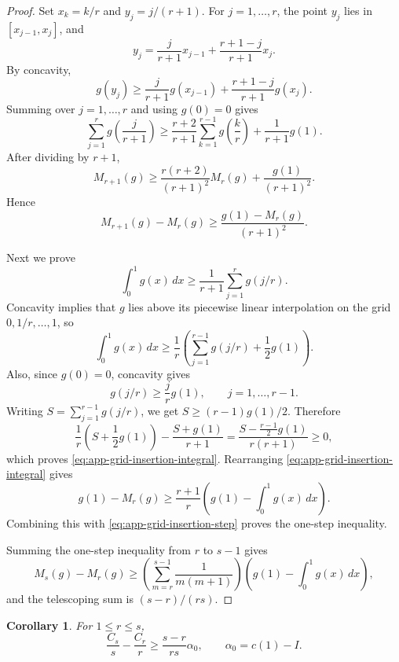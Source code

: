 \documentclass[11pt]{article}
\numberwithin{equation}{section}
\newtheorem{corollary}[corollary]{Corollary}
\newcommand{\dd}{\,d}
\begin{document}
\begin{proof}
Set $x_k=k/r$ and $y_j=j/(r+1)$. For $j=1,\ldots,r$, the point $y_j$ lies in $[x_{j-1},x_j]$, and
\[
  y_j
  =
  \frac{j}{r+1}x_{j-1}
  +
  \frac{r+1-j}{r+1}x_j.
\]
By concavity,
\[
  g(y_j)
  \ge
  \frac{j}{r+1}g(x_{j-1})
  +
  \frac{r+1-j}{r+1}g(x_j).
\]
Summing over $j=1,\ldots,r$ and using $g(0)=0$ gives
\[
  \sum_{j=1}^r g\left(\frac{j}{r+1}\right)
  \ge
  \frac{r+2}{r+1}\sum_{k=1}^{r-1}g\left(\frac{k}{r}\right)
  +
  \frac{1}{r+1}g(1).
\]
After dividing by $r+1$,
\[
  M_{r+1}(g)
  \ge
  \frac{r(r+2)}{(r+1)^2}M_r(g)
  +
  \frac{g(1)}{(r+1)^2}.
\]
Hence
\begin{equation}\label{eq:app-grid-insertion-step}
  M_{r+1}(g)-M_r(g)
  \ge
  \frac{g(1)-M_r(g)}{(r+1)^2}.
\end{equation}

Next we prove
\begin{equation}\label{eq:app-grid-insertion-integral}
  \int_0^1g(x)\dd x
  \ge
  \frac{1}{r+1}\sum_{j=1}^r g(j/r).
\end{equation}
Concavity implies that $g$ lies above its piecewise linear interpolation on the grid $0,1/r,\ldots,1$, so
\[
  \int_0^1g(x)\dd x
  \ge
  \frac1r\left(\sum_{j=1}^{r-1}g(j/r)+\frac12g(1)\right).
\]
Also, since $g(0)=0$, concavity gives
\[
  g(j/r)\ge \frac jr g(1),
  \qquad j=1,\ldots,r-1.
\]
Writing $S=\sum_{j=1}^{r-1}g(j/r)$, we get $S\ge (r-1)g(1)/2$. Therefore
\[
  \frac1r\left(S+\frac12g(1)\right)
  -
  \frac{S+g(1)}{r+1}
  =
  \frac{S-\frac{r-1}{2}g(1)}{r(r+1)}
  \ge 0,
\]
which proves \eqref{eq:app-grid-insertion-integral}. Rearranging \eqref{eq:app-grid-insertion-integral} gives
\[
  g(1)-M_r(g)
  \ge
  \frac{r+1}{r}
  \left(g(1)-\int_0^1g(x)\dd x\right).
\]
Combining this with \eqref{eq:app-grid-insertion-step} proves the one-step inequality.

Summing the one-step inequality from $r$ to $s-1$ gives
\[
  M_s(g)-M_r(g)
  \ge
  \left(\sum_{m=r}^{s-1}\frac{1}{m(m+1)}\right)
  \left(g(1)-\int_0^1g(x)\dd x\right),
\]
and the telescoping sum is $(s-r)/(rs)$.
\end{proof}

\begin{corollary}\label{cor:app-C-balancing}
For $1\le r\le s$,
\begin{equation}\label{eq:app-C-balancing}
  \frac{C_s}{s}-\frac{C_r}{r}
  \ge
  \frac{s-r}{rs}\alpha_0,
  \qquad
  \alpha_0=c(1)-I.
\end{equation}
\end{corollary}
\end{document}
